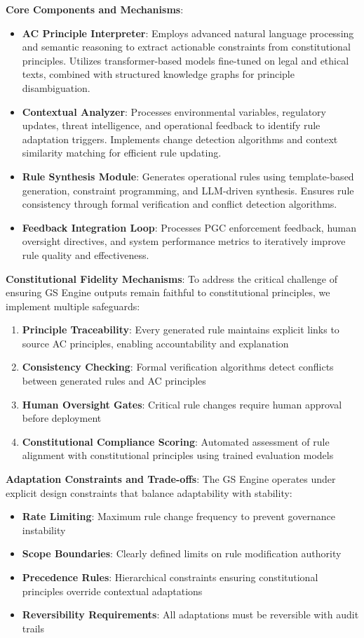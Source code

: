 \documentclass[sigconf,review,anonymous=false]{acmart} %
\begin{document}
\textbf{Core Components and Mechanisms}:
\begin{itemize}
    \item \textbf{AC Principle Interpreter}: Employs advanced natural language processing and semantic reasoning to extract actionable constraints from constitutional principles. Utilizes transformer-based models fine-tuned on legal and ethical texts, combined with structured knowledge graphs for principle disambiguation.
    \item \textbf{Contextual Analyzer}: Processes environmental variables, regulatory updates, threat intelligence, and operational feedback to identify rule adaptation triggers. Implements change detection algorithms and context similarity matching for efficient rule updating.
    \item \textbf{Rule Synthesis Module}: Generates operational rules using template-based generation, constraint programming, and LLM-driven synthesis. Ensures rule consistency through formal verification and conflict detection algorithms.
    \item \textbf{Feedback Integration Loop}: Processes PGC enforcement feedback, human oversight directives, and system performance metrics to iteratively improve rule quality and effectiveness.
\end{itemize}

\textbf{Constitutional Fidelity Mechanisms}: To address the critical challenge of ensuring GS Engine outputs remain faithful to constitutional principles, we implement multiple safeguards:
\begin{enumerate}
    \item \textbf{Principle Traceability}: Every generated rule maintains explicit links to source AC principles, enabling accountability and explanation
    \item \textbf{Consistency Checking}: Formal verification algorithms detect conflicts between generated rules and AC principles
    \item \textbf{Human Oversight Gates}: Critical rule changes require human approval before deployment
    \item \textbf{Constitutional Compliance Scoring}: Automated assessment of rule alignment with constitutional principles using trained evaluation models
\end{enumerate}

\textbf{Adaptation Constraints and Trade-offs}: The GS Engine operates under explicit design constraints that balance adaptability with stability:
\begin{itemize}
    \item \textbf{Rate Limiting}: Maximum rule change frequency to prevent governance instability
    \item \textbf{Scope Boundaries}: Clearly defined limits on rule modification authority
    \item \textbf{Precedence Rules}: Hierarchical constraints ensuring constitutional principles override contextual adaptations
    \item \textbf{Reversibility Requirements}: All adaptations must be reversible with audit trails
\end{itemize}
\end{document}
